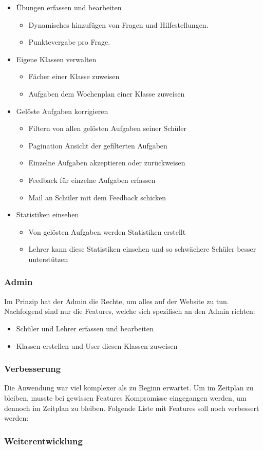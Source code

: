 \begin{itemize}
	\item Übungen erfassen und bearbeiten
	\begin{itemize}
		\item Dynamisches hinzufügen von Fragen und Hilfestellungen.
		\item Punktevergabe pro Frage.
	\end{itemize}
	\item Eigene Klassen verwalten
	\begin{itemize}
		\item Fächer einer Klasse zuweisen
		\item Aufgaben dem Wochenplan einer Klasse zuweisen
	\end{itemize}
	\item Gelöste Aufgaben korrigieren
	\begin{itemize}
		\item Filtern von allen gelösten Aufgaben seiner Schüler
		\item Pagination Ansicht der gefilterten Aufgaben
		\item Einzelne Aufgaben akzeptieren oder zurückweisen
		\item Feedback für einzelne Aufgaben erfassen
		\item Mail an Schüler mit dem Feedback schicken
	\end{itemize}
	\item Statistiken einsehen
	\begin{itemize}
		\item Von gelösten Aufgaben werden Statistiken erstellt
		\item Lehrer kann diese Statistiken einsehen und so schwächere Schüler besser unterstützen
	\end{itemize}
\end{itemize}


\subsubsection*{Admin}
Im Prinzip hat der Admin die Rechte, um alles auf der Website zu tun. Nachfolgend sind nur die Features, welche sich spezifisch an den Admin richten:

\begin{itemize}
	\item Schüler und Lehrer erfassen und bearbeiten
	\item Klassen erstellen und User diesen Klassen zuweisen
\end{itemize}


\subsubsection{Verbesserung}
Die Anwendung war viel komplexer als zu Beginn erwartet. Um im Zeitplan zu bleiben, musste bei gewissen Features  Kompromisse eingegangen werden, um dennoch im Zeitplan zu bleiben. Folgende Liste mit Features soll noch verbessert werden:


\subsubsection{Weiterentwicklung}

\newpage
